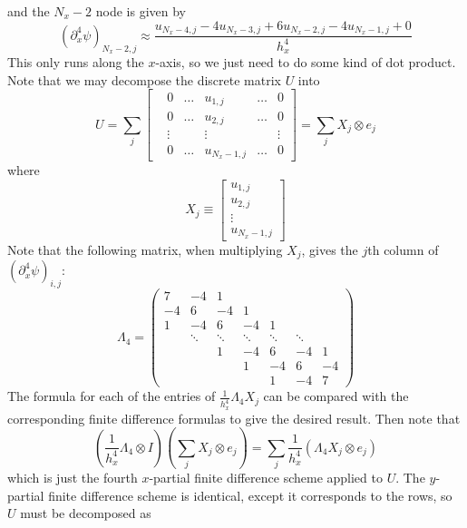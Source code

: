 \documentclass[reqno]{article}
\begin{document}
	and the $N_x - 2$ node is given by
	\begin{equation}
		(\partial_x^4 \psi)_{N_x - 2, j} \approx \frac{u_{N_x - 4, j} - 4u_{N_x - 3, j} + 6u_{N_x - 2, j} - 4u_{N_x - 1, j} + 0}{h_x^4}
	\end{equation}
	This only runs along the $x$-axis, so we just need to do some kind of dot product. Note that we may decompose the discrete matrix $U$ into
	\begin{equation}
		U = \sum_j
		\begin{bmatrix}
			&0 &\ldots &u_{1,j} & \ldots&0 \\
			&0 &\ldots &u_{2,j} &\ldots &0 \\
			&\vdots & &\vdots & &\vdots \\
			&0 &\ldots &u_{N_x - 1,j} &\ldots &0
		\end{bmatrix}
		= \sum_j X_j \otimes e_j
	\end{equation}
	where
	\begin{equation}
		X_j \equiv 
		\begin{bmatrix}
			u_{1,j} \\
			u_{2,j} \\
			\vdots \\
			u_{N_x - 1,j}
		\end{bmatrix}
	\end{equation}
	Note that the following matrix, when multiplying $X_j$, gives the $j$th column of $(\partial_x^4 \psi)_{i, j}$:
	\begin{equation}
		\Lambda_4 = \begin{pmatrix}
		7 & -4 & 1\\
		-4 & 6 & -4 & 1\\
		1 & -4 & 6 & -4 & 1\\
		&\ddots&\ddots&\ddots&\ddots&\ddots\\
		&&1 & -4 & 6 & -4 & 1\\
		&&&1 & -4 & 6 & -4\\
		&&&&1 & -4 & 7
		\end{pmatrix}
	\end{equation}
	The formula for each of the entries of $\frac{1}{h_x^4}\Lambda_4 X_j$ can be compared with the corresponding finite difference formulas to give the desired result. Then note that
	\begin{equation}
		\left(\frac{1}{h_x^4} \Lambda_4 \otimes I\right) \left(\sum_j X_j \otimes e_j\right) = \sum_j \frac{1}{h_x^4} \left(\Lambda_4 X_j \otimes e_j\right)
	\end{equation}
	which is just the fourth $x$-partial finite difference scheme applied to $U$. The $y$-partial finite difference scheme is identical, except it corresponds to the rows, so $U$ must be decomposed as
\end{document}
